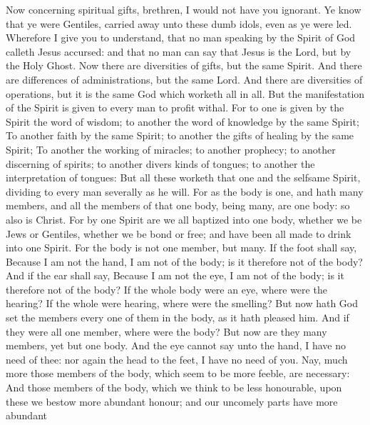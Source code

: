  Now concerning spiritual gifts, brethren, I would not have
you ignorant.  Ye know that ye were Gentiles, carried away
unto these dumb idols, even as ye were led.  Wherefore I
give you to understand, that no man speaking by the Spirit of God
calleth Jesus accursed: and that no man can say that Jesus is the Lord,
but by the Holy Ghost.  Now there are diversities of gifts,
but the same Spirit.  And there are differences of
administrations, but the same Lord.  And there are
diversities of operations, but it is the same God which worketh all in
all.  But the manifestation of the Spirit is given to every
man to profit withal.  For to one is given by the Spirit the
word of wisdom; to another the word of knowledge by the same Spirit;
 To another faith by the same Spirit; to another the gifts
of healing by the same Spirit;  To another the working of
miracles; to another prophecy; to another discerning of spirits; to
another divers kinds of tongues; to another the interpretation of
tongues:  But all these worketh that one and the selfsame
Spirit, dividing to every man severally as he will.  For as
the body is one, and hath many members, and all the members of that one
body, being many, are one body: so also is Christ.  For by
one Spirit are we all baptized into one body, whether we be Jews or
Gentiles, whether we be bond or free; and have been all made to drink
into one Spirit.  For the body is not one member, but many.
 If the foot shall say, Because I am not the hand, I am not
of the body; is it therefore not of the body?  And if the
ear shall say, Because I am not the eye, I am not of the body; is it
therefore not of the body?  If the whole body were an eye,
where were the hearing? If the whole were hearing, where were the
smelling?  But now hath God set the members every one of
them in the body, as it hath pleased him.  And if they were
all one member, where were the body?  But now are they many
members, yet but one body.  And the eye cannot say unto the
hand, I have no need of thee: nor again the head to the feet, I have no
need of you.  Nay, much more those members of the body,
which seem to be more feeble, are necessary:  And those
members of the body, which we think to be less honourable, upon these we
bestow more abundant honour; and our uncomely parts have more abundant
